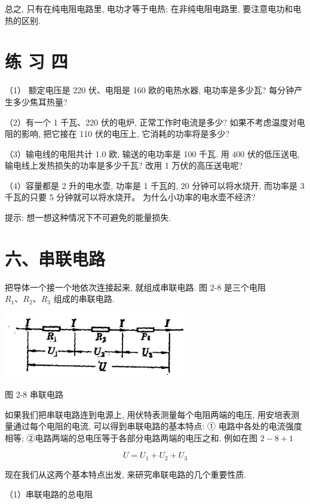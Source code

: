 \documentclass[10pt]{article}
\begin{document}
总之, 只有在纯电阻电路里, 电功才等于电热; 在非纯电阻电路里, 要注意电功和电热的区别.

\section*{练 习 四}

（1） 额定电压是 220 伏、电阻是 160 欧的电热水器, 电功率是多少瓦? 每分钟产生多少焦耳热量?

（2）有一个 1 千瓦、220 伏的电炉, 正常工作时电流是多少? 如果不考虑温度对电阻的影响, 把它接在 110 伏的电压上, 它消耗的功率将是多少?

（3）输电线的电阻共计 1.0 欧, 输送的电功率是 100 千瓦. 用 400 伏的低压送电, 输电线上发热损失的功率是多少千瓦? 改用 1 万伏的高压送电呢?

（4）容量都是 2 升的电水壶, 功率是 1 千瓦的, 20 分钟可以将水烧开, 而功率是 3 千瓦的只要 5 分钟就可以将水烧开。 为什么小功率的电水壶不经济?

提示: 想一想这种情况下不可避免的能量损失.

\section*{六、串联电路}

把导体一个接一个地依次连接起来, 就组成串联电路. 图 2-8 是三个电阻 \({R}_{1}\text{、}{R}_{2}\text{、}{R}_{3}\) 组成的串联电路.

\begin{center}
\includegraphics[max width=0.6\textwidth]{images/01913056-1f15-74d8-9184-9aab52c9d66b_72_225101.jpg}
\end{center}

图 2-8 串联电路

如果我们把串联电路连到电源上, 用伏特表测量每个电阻两端的电压, 用安培表测量通过每个电阻的电流, 可以得到串联电路的基本特点: ① 电路中各处的电流强度相等; ②电路两端的总电压等于各部分电路两端的电压之和. 例如在图 \(2 - 8 + 1\)

\[
U = {U}_{1} + {U}_{2} + {U}_{3}
\]

现在我们从这两个基本特点出发, 来研究串联电路的几个重要性质.

（1）串联电路的总电阻
\end{document}

